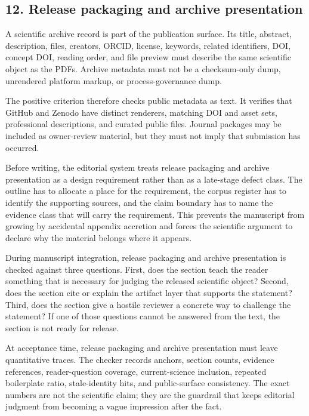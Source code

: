 \subsection{12. Release packaging and archive presentation}

A scientific archive record is part of the publication surface. Its title, abstract, description, files, creators, ORCID, license, keywords, related identifiers, DOI, concept DOI, reading order, and file preview must describe the same scientific object as the PDFs. Archive metadata must not be a checksum-only dump, unrendered platform markup, or process-governance dump.


The positive criterion therefore checks public metadata as text. It verifies that GitHub and Zenodo have distinct renderers, matching DOI and asset sets, professional descriptions, and curated public files. Journal packages may be included as owner-review material, but they must not imply that submission has occurred.


Before writing, the editorial system treats release packaging and archive presentation as a design requirement rather than as a late-stage defect class. The outline has to allocate a place for the requirement, the corpus register has to identify the supporting sources, and the claim boundary has to name the evidence class that will carry the requirement. This prevents the manuscript from growing by accidental appendix accretion and forces the scientific argument to declare why the material belongs where it appears.


During manuscript integration, release packaging and archive presentation is checked against three questions. First, does the section teach the reader something that is necessary for judging the released scientific object? Second, does the section cite or explain the artifact layer that supports the statement? Third, does the section give a hostile reviewer a concrete way to challenge the statement? If one of those questions cannot be answered from the text, the section is not ready for release.


At acceptance time, release packaging and archive presentation must leave quantitative traces. The checker records anchors, section counts, evidence references, reader-question coverage, current-science inclusion, repeated boilerplate ratio, stale-identity hits, and public-surface consistency. The exact numbers are not the scientific claim; they are the guardrail that keeps editorial judgment from becoming a vague impression after the fact.



